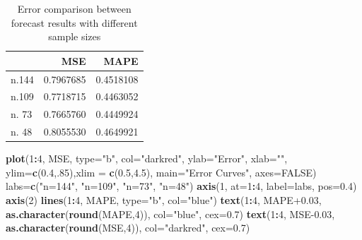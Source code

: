 \documentclass[
]{book}
\newenvironment{Shaded}{\begin{snugshade}}{\end{snugshade}}
\newcommand{\AttributeTok}[1]{\textcolor[rgb]{0.13,0.29,0.53}{#1}}
\newcommand{\ConstantTok}[1]{\textcolor[rgb]{0.56,0.35,0.01}{#1}}
\newcommand{\DecValTok}[1]{\textcolor[rgb]{0.00,0.00,0.81}{#1}}
\newcommand{\FloatTok}[1]{\textcolor[rgb]{0.00,0.00,0.81}{#1}}
\newcommand{\FunctionTok}[1]{\textcolor[rgb]{0.13,0.29,0.53}{\textbf{#1}}}
\newcommand{\NormalTok}[1]{#1}
\newcommand{\OtherTok}[1]{\textcolor[rgb]{0.56,0.35,0.01}{#1}}
\newcommand{\SpecialCharTok}[1]{\textcolor[rgb]{0.81,0.36,0.00}{\textbf{#1}}}
\newcommand{\StringTok}[1]{\textcolor[rgb]{0.31,0.60,0.02}{#1}}
\begin{document}
\begin{table}

\caption{\label{tab:unnamed-chunk-220}Error comparison between forecast results with different sample sizes}
\centering
\begin{tabular}[t]{l|r|r}
\hline
  & MSE & MAPE\\
\hline
n.144 & 0.7967685 & 0.4518108\\
\hline
n.109 & 0.7718715 & 0.4463052\\
\hline
n. 73 & 0.7665760 & 0.4449924\\
\hline
n. 48 & 0.8055530 & 0.4649921\\
\hline
\end{tabular}
\end{table}

\newpage

\begin{Shaded}
\begin{Highlighting}[]
\FunctionTok{plot}\NormalTok{(}\DecValTok{1}\SpecialCharTok{:}\DecValTok{4}\NormalTok{, MSE, }\AttributeTok{type=}\StringTok{"b"}\NormalTok{, }\AttributeTok{col=}\StringTok{"darkred"}\NormalTok{, }\AttributeTok{ylab=}\StringTok{"Error"}\NormalTok{, }\AttributeTok{xlab=}\StringTok{""}\NormalTok{,}
     \AttributeTok{ylim=}\FunctionTok{c}\NormalTok{(}\FloatTok{0.4}\NormalTok{,.}\DecValTok{85}\NormalTok{),}\AttributeTok{xlim =} \FunctionTok{c}\NormalTok{(}\FloatTok{0.5}\NormalTok{,}\FloatTok{4.5}\NormalTok{), }\AttributeTok{main=}\StringTok{"Error Curves"}\NormalTok{, }\AttributeTok{axes=}\ConstantTok{FALSE}\NormalTok{)}
\NormalTok{labs}\OtherTok{=}\FunctionTok{c}\NormalTok{(}\StringTok{"n=144"}\NormalTok{, }\StringTok{"n=109"}\NormalTok{, }\StringTok{"n=73"}\NormalTok{, }\StringTok{"n=48"}\NormalTok{)}
\FunctionTok{axis}\NormalTok{(}\DecValTok{1}\NormalTok{, }\AttributeTok{at=}\DecValTok{1}\SpecialCharTok{:}\DecValTok{4}\NormalTok{, }\AttributeTok{label=}\NormalTok{labs, }\AttributeTok{pos=}\FloatTok{0.4}\NormalTok{)}
\FunctionTok{axis}\NormalTok{(}\DecValTok{2}\NormalTok{)}
\FunctionTok{lines}\NormalTok{(}\DecValTok{1}\SpecialCharTok{:}\DecValTok{4}\NormalTok{, MAPE, }\AttributeTok{type=}\StringTok{"b"}\NormalTok{, }\AttributeTok{col=}\StringTok{"blue"}\NormalTok{)}
\FunctionTok{text}\NormalTok{(}\DecValTok{1}\SpecialCharTok{:}\DecValTok{4}\NormalTok{, MAPE}\FloatTok{+0.03}\NormalTok{, }\FunctionTok{as.character}\NormalTok{(}\FunctionTok{round}\NormalTok{(MAPE,}\DecValTok{4}\NormalTok{)), }\AttributeTok{col=}\StringTok{"blue"}\NormalTok{, }\AttributeTok{cex=}\FloatTok{0.7}\NormalTok{)}
\FunctionTok{text}\NormalTok{(}\DecValTok{1}\SpecialCharTok{:}\DecValTok{4}\NormalTok{, MSE}\FloatTok{{-}0.03}\NormalTok{, }\FunctionTok{as.character}\NormalTok{(}\FunctionTok{round}\NormalTok{(MSE,}\DecValTok{4}\NormalTok{)), }\AttributeTok{col=}\StringTok{"darkred"}\NormalTok{, }\AttributeTok{cex=}\FloatTok{0.7}\NormalTok{)}

\end{Highlighting}
\end{Shaded}
\end{document}
